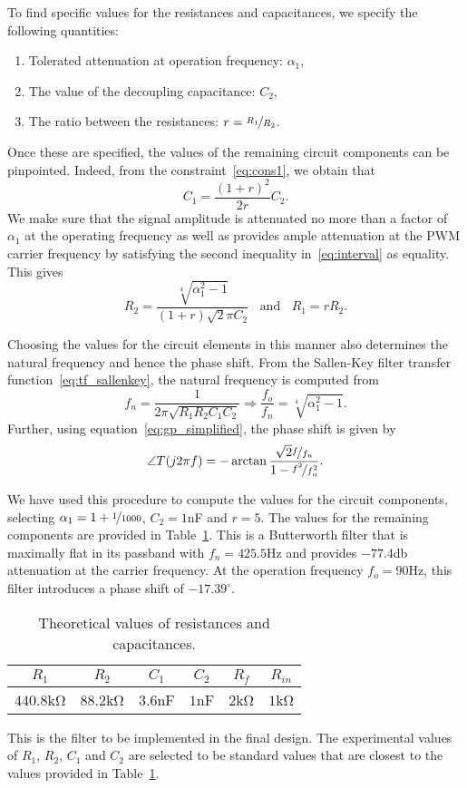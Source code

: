 To find specific values for the resistances and capacitances, we specify the
following quantities:
%
\begin{enumerate}
    \item Tolerated attenuation at operation frequency: $\alpha_1$,
    \item The value of the decoupling capacitance: $C_2$,
    \item The ratio between the resistances: $r = \nicefrac{R_1}{R_2}$.
\end{enumerate}
%
Once these are specified, the values of the remaining
circuit components can be pinpointed. Indeed, from the
constraint~\eqref{eq:cons1}, we obtain that \[C_1 = \frac{(1+r)^2}{2r}C_2. \] 
%
We make sure that the signal amplitude is attenuated no more than
a factor of $\alpha_1$ at the operating frequency as well as provides ample
attenuation at the PWM carrier frequency by satisfying the second inequality
in~\eqref{eq:interval} as equality. This gives \[ R_2 =
\frac{\sqrt[4]{\alpha_1^2-1}}{(1+r)\sqrt{2}\pi C_2} \;\; \text{ and } \;\; R_1 =
rR_2.\]

\begin{rem}
    Choosing the values for the circuit elements in this manner also determines
    the natural frequency and hence the phase shift. From the Sallen-Key filter
    transfer function~\ref{eq:tf_sallenkey}, the natural frequency is computed
    from \[f_n = \frac{1}{2\pi \sqrt{R_1R_2C_1C_2}} \Rightarrow \frac{f_o}{f_n}
    = \sqrt[4]{\alpha_1^2 -1}. \]
    Further, using equation~\eqref{eq:gp_simplified}, the phase shift is
    given by \[ \angle T(j2\pi f) =
    -\arctan{\frac{\sqrt{2}\nicefrac{f}{f_n}}{1-\nicefrac{f^2}{f_n^2}}}. \]
\end{rem}

We have used this procedure to compute the values for the circuit components,
selecting $\alpha_1 = 1+\nicefrac{1}{1000}$, $C_2 = 1$\unit{\nano\farad} and $r
= 5$. The values for the remaining components are provided in
Table~\ref{tab:theoretical_values}. This is a Butterworth filter that is
maximally flat in its passband with $f_n = 425.5$\unit{\hertz} and provides
$-77.4$\unit{\decibel} attenuation at the carrier frequency. At the operation
frequency $f_o = 90$\unit{\hertz}, this filter introduces a phase shift of
$-17.39^\circ$.

{\renewcommand{\arraystretch}{1.5}
\begin{table}[t]
    \centering
    \caption{Theoretical values of resistances and capacitances.}
    \begin{tabular}{*6c}
        \toprule
        $R_1$ & $R_2$ & $C_1$ & $C_2$ & $R_f$ & $R_{in}$ \\    
        \hline
        \midrule
        $440.8$\unit{\kilo\ohm} & $88.2$\unit{\kilo\ohm} &
        $3.6$\unit{\nano\farad} & $1$\unit{\nano\farad} &
        $2$\unit{\kilo\ohm} & $1$\unit{\kilo\ohm} \\
        \bottomrule
    \end{tabular}
    \label{tab:theoretical_values}
    \vspace{-1em}
\end{table}
}

\begin{rem}
    This is the filter to be implemented in the final design. The experimental
    values of $R_{1}$, $R_2$, $C_{1}$ and $C_2$ are selected to be standard
    values that are closest to the values provided in
    Table~\ref{tab:theoretical_values}.
\end{rem}
